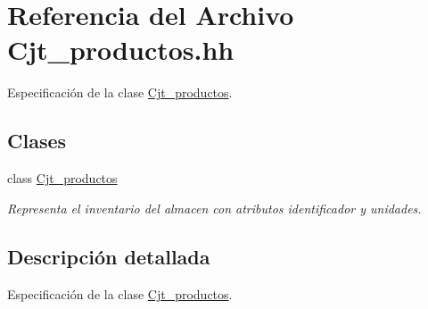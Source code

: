 \hypertarget{_cjt__productos_8hh}{}\section{Referencia del Archivo Cjt\+\_\+productos.\+hh}
\label{_cjt__productos_8hh}


Especificación de la clase \hyperlink{class_cjt__productos}{Cjt\+\_\+productos}.  


\subsection*{Clases}
\begin{DoxyCompactItemize}
\item 
class \hyperlink{class_cjt__productos}{Cjt\+\_\+productos}
\begin{DoxyCompactList}\small\item\em Representa el inventario del almacen con atributos identificador y unidades. \end{DoxyCompactList}\end{DoxyCompactItemize}


\subsection{Descripción detallada}
Especificación de la clase \hyperlink{class_cjt__productos}{Cjt\+\_\+productos}. 

